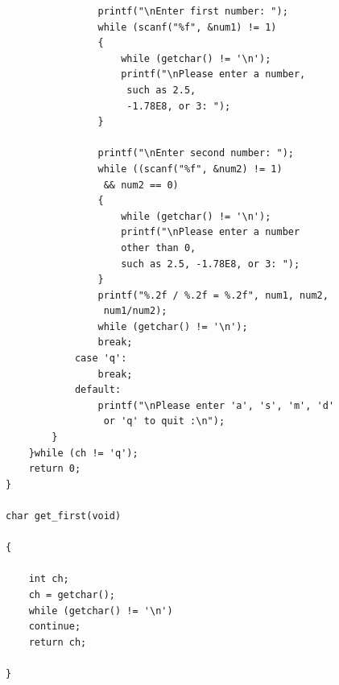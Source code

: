 \documentclass[UTF8]{article}
\begin{document}
\begin{lstlisting}
                printf("\nEnter first number: ");
                while (scanf("%f", &num1) != 1)
                {
                    while (getchar() != '\n');
                    printf("\nPlease enter a number,
                     such as 2.5,
                     -1.78E8, or 3: ");
                }

                printf("\nEnter second number: ");
                while ((scanf("%f", &num2) != 1)
                 && num2 == 0)
                {
                    while (getchar() != '\n');
                    printf("\nPlease enter a number
                    other than 0,
                    such as 2.5, -1.78E8, or 3: ");
                }
                printf("%.2f / %.2f = %.2f", num1, num2,
                 num1/num2);
                while (getchar() != '\n');
                break;
            case 'q':
                break;
            default:
                printf("\nPlease enter 'a', 's', 'm', 'd'
                 or 'q' to quit :\n");
        }
    }while (ch != 'q');
    return 0;
}

char get_first(void)

{

    int ch;
    ch = getchar();
    while (getchar() != '\n')
    continue;
	return ch;

}
\end{lstlisting}
\end{document}
